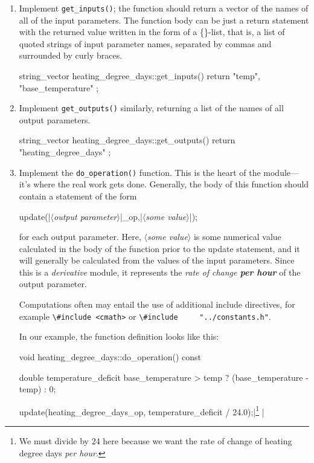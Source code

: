 \documentclass{article}\usepackage[]{graphicx}\usepackage[]{color}
\newcommand{\code}[1]{\lstinline[style=C++style]{#1}}
\newcommand{\placeholder}[1]{$\langle$\textrm{\textit{#1}}$\rangle$}
\begin{document}
\begin{enumerate}
\item Implement \code{get_inputs()}; the function should return a
  vector of the names of all of the input parameters.  The function
  body can be just a return statement with the returned value written
  in the form of a \{\}-list, that is, a list of quoted strings of
  input parameter names, separated by commas and surrounded by curly
  braces.

  \begin{example}[4]
    string_vector heating_degree_days::get_inputs() {
        return {
            "temp",
            "base_temperature"
        };
    }
  \end{example}

\item Implement \code{get_outputs()} similarly, returning a list of
  the names of all output parameters.
  \begin{example}[4]
    string_vector heating_degree_days::get_outputs() {
        return {
            "heating_degree_days"
        };
    }
  \end{example}

\item Implement the \code{do_operation()} function.  This is the heart
  of the module---it's where the real work gets done.  Generally, the
  body of this function should contain a statement of the form
  \begin{C++listing}[4]
    update(|\placeholder{output parameter}|_op,|\placeholder{some value}|);
  \end{C++listing}
  for each output parameter.  Here, \placeholder{some value} is some
  numerical value calculated in the body of the function prior to the
  update statement, and it will generally be calculated from the
  values of the input parameters.  Since this is a \emph{derivative}
  module, it represents the \emph{rate of change \textbf{per hour}} of
  the output parameter.

  Computations
  often may entail the use of additional include directives, for
  example \code{\#include <cmath>} or \code{\#include
    "../constants.h"}.

  In our example, the function definition looks like this:
  \begin{example}[4]
    void heating_degree_days::do_operation() const {
        double temperature_deficit { base_temperature > temp ?
                                     (base_temperature - temp) : 0};

        update(heating_degree_days_op, temperature_deficit / 24.0);|\footnote{We must divide by 24 here because we want the rate of change of heating degree days \emph{per hour}.}%
      |
    }
  \end{example}

\end{enumerate}
\end{document}
